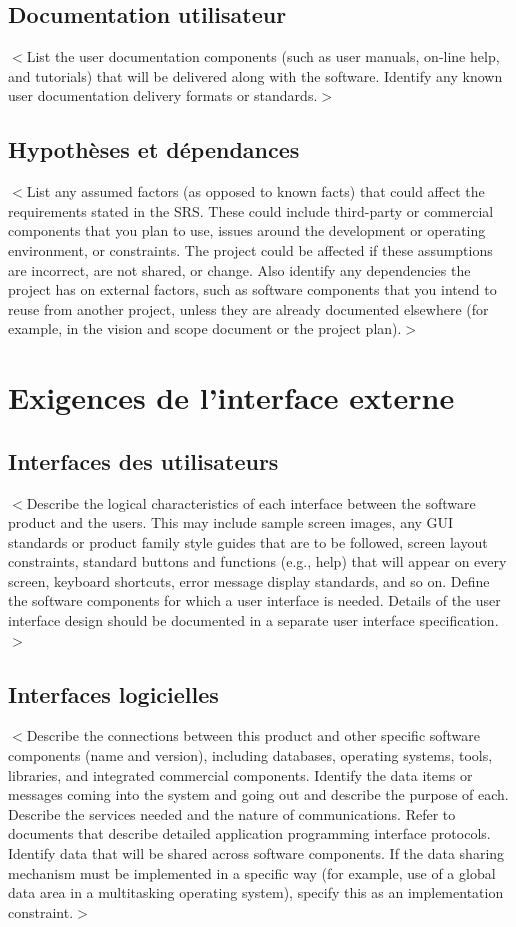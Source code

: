 \documentclass[titlepage, 12pt]{report}
\begin{document}
\section{Documentation utilisateur}
$<$List the user documentation components (such as user manuals, on-line help, 
and tutorials) that will be delivered along with the software. Identify any 
known user documentation delivery formats or standards.$>$

\section{Hypothèses et dépendances}

$<$List any assumed factors (as opposed to known facts) that could affect the 
requirements stated in the SRS. These could include third-party or commercial 
components that you plan to use, issues around the development or operating 
environment, or constraints. The project could be affected if these assumptions 
are incorrect, are not shared, or change. Also identify any dependencies the 
project has on external factors, such as software components that you intend to 
reuse from another project, unless they are already documented elsewhere (for 
example, in the vision and scope document or the project plan).$>$


\chapter{Exigences de l'interface externe}

\section{Interfaces des utilisateurs}
$<$Describe the logical characteristics of each interface between the software 
product and the users. This may include sample screen images, any GUI standards 
or product family style guides that are to be followed, screen layout 
constraints, standard buttons and functions (e.g., help) that will appear on 
every screen, keyboard shortcuts, error message display standards, and so on.  
Define the software components for which a user interface is needed. Details of 
the user interface design should be documented in a separate user interface 
specification.$>$

\section{Interfaces logicielles}
$<$Describe the connections between this product and other specific software 
components (name and version), including databases, operating systems, tools, 
libraries, and integrated commercial components. Identify the data items or 
messages coming into the system and going out and describe the purpose of each.  
Describe the services needed and the nature of communications. Refer to 
documents that describe detailed application programming interface protocols.  
Identify data that will be shared across software components. If the data 
sharing mechanism must be implemented in a specific way (for example, use of a 
global data area in a multitasking operating system), specify this as an 
implementation constraint.$>$
\end{document}
